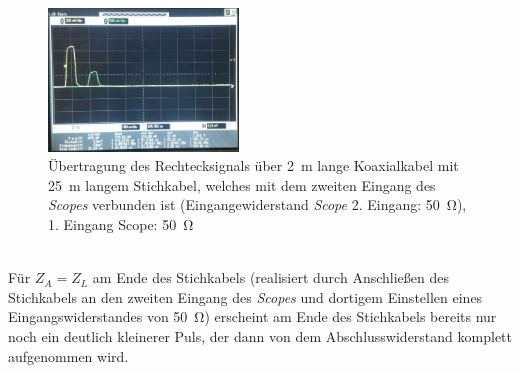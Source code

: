 \documentclass[a4paper,twoside,final]{article}
\begin{document}
\begin{figure}[htp]
    \centering
        \includegraphics[width=0.45\textwidth]{Bilder/Bild8.jpg}
    \caption{Übertragung des Rechtecksignals über \SI{2}{\metre} lange Koaxialkabel mit \SI{25}{\metre} langem Stichkabel, welches mit dem zweiten Eingang des \textit{Scopes} verbunden ist (Eingangewiderstand \textit{Scope} 2. Eingang: \SI{50}{\ohm}), 1. Eingang Scope: \SI{50}{\ohm}}
\end{figure}\\
Für $Z_A = Z_L$ am Ende des Stichkabels (realisiert durch Anschließen des Stichkabels an den zweiten Eingang des \textit{Scopes} und dortigem Einstellen eines Eingangswiderstandes von \SI{50}{\ohm}) erscheint am Ende des Stichkabels bereits nur noch ein deutlich kleinerer Puls, der dann von dem Abschlusswiderstand komplett aufgenommen wird.\\
\end{document}

